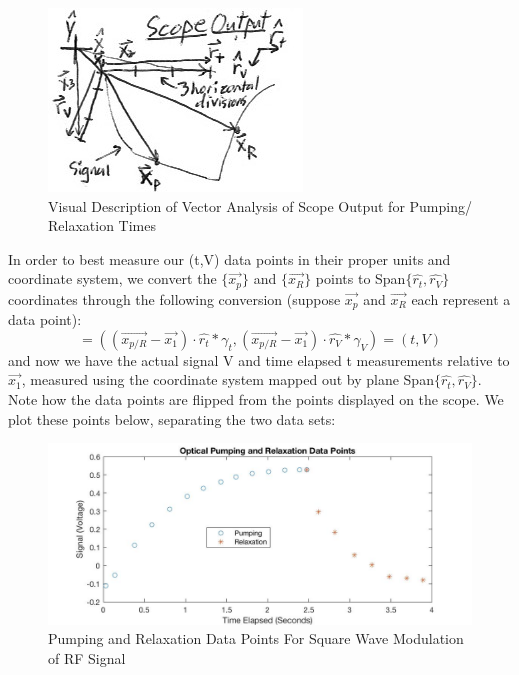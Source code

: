 \documentclass{article}
\begin{document}
\begin{figure}[H] %
        \centering
        \includegraphics[scale = 0.4]{12.jpg}
        \caption{Visual Description of Vector Analysis of Scope Output for Pumping/ Relaxation Times}
        \label{fig:my_label}
    \end{figure}
In order to best measure our (t,V) data points in their proper units and coordinate system, we convert the $\{\vec{x_p}\}$ and $\{\vec{x_R}\}$ points to Span$\{\hat{r_t},\hat{r_V}\}$ coordinates through the following conversion (suppose $\vec{x_p}$ and $\vec{x_R}$ each represent a data point):
\begin{equation}
      [\vec{r_{p/R}}] = ((\vec{x_{p/R}}-\vec{x_1})\cdot\hat{r_t}*\gamma_t,(\vec{x_{p/R}}-\vec{x_1})\cdot\hat{r_V}*\gamma_V) = (t,V)
\end{equation}
and now we have the actual signal V and time elapsed t measurements relative to $\vec{x_1}$, measured using the coordinate system mapped out by plane Span$\{\hat{r_t},\hat{r_V}\}$. Note how the data points are flipped from the points displayed on the scope. We plot these points below, separating the two data sets:
\begin{figure}[H] %
        \centering
        \includegraphics[scale = 0.25]{5.jpg}
        \caption{Pumping and Relaxation Data Points For Square Wave Modulation of RF Signal}
        \label{fig:my_label}
    \end{figure}
\end{document}
